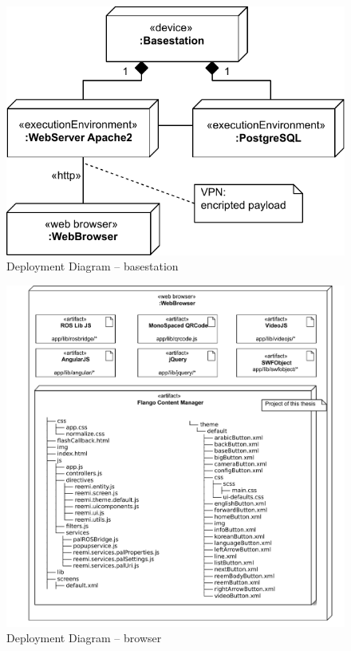 \begin{figure}[htb]
    \centering
    \includegraphics{figures/design-deployment-basestation.pdf}
    \caption{Deployment Diagram -- basestation}
    \label{fig:deploy-basestation}
\end{figure}

\begin{figure}
    \centering
    \includegraphics{figures/design-deployment-browser.pdf}
    \caption{Deployment Diagram -- browser}
    \label{fig:deploy-browser}
\end{figure}

